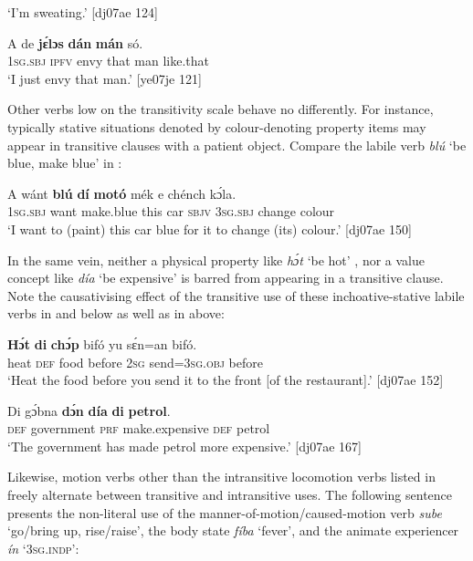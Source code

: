 \glt ‘I’m sweating.’ [dj07ae 124]
\z


\ea%
    \label{ex:key:1104}
    \gll A    de  \textbf{jɛ́lɔs}  \textbf{dán}    \textbf{mán}  só.\\
\textsc{1sg.sbj}  \textsc{ipfv}  envy  that    man    like.that\\

\glt ‘I just envy that man.’ [ye07je 121]
\z

Other verbs low on the transitivity scale behave no differently. For instance, typically stative situations denoted by colour-denoting property items may appear in transitive clauses with a patient object. Compare the labile verb \textit{blú} ‘be blue, make blue’ in :


\ea%
    \label{ex:key:1105}
    \gll A    wánt  \textbf{blú}      \textbf{dí}  \textbf{motó}  mék    e    chénch  kɔ́la.\\
\textsc{1sg.sbj}  want  make.blue  this  car    \textsc{sbjv}    \textsc{3sg.sbj}  change  colour\\

\glt ‘I want to (paint) this car blue for it to change (its) colour.’ [dj07ae 150]
\z

In the same vein, neither a physical property like \textit{hɔ́t} ‘be hot’ , nor a value concept like \textit{día} ‘be expensive’  is barred from appearing in a transitive clause. Note the causativising effect of the transitive use of these inchoative-stative labile verbs in  and  below as well as in  above: 

\ea%
    \label{ex:key:1106}
    \gll \textbf{Hɔ́t}    \textbf{di}  \textbf{chɔ́p}  bifó    yu  sɛ́n=an    bifó.\\
heat    \textsc{def}  food    before  \textsc{2sg}  send=\textsc{3sg.obj}  before\\

\glt ‘Heat the food before you send it to the front [of the restaurant].’ [dj07ae 152]
\z


\ea%
    \label{ex:key:1107}
    \gll Di  gɔ́bna    \textbf{dɔ́n}  \textbf{día}        \textbf{di}  \textbf{petrol}.\\
\textsc{def}  government  \textsc{prf}  make.expensive  \textsc{def}  petrol\\

\glt ‘The government has made petrol more expensive.’ [dj07ae 167]
\z

Likewise, motion verbs other than the intransitive locomotion verbs listed in  freely alternate between transitive and intransitive uses. The following sentence presents the non-literal use of the manner-of-motion/caused-motion verb \textit{sube} ‘go/bring up, rise{\slash}raise’, the body state \textit{fíba} ‘fever’, and the animate experiencer \textit{ín} ‘\textsc{3sg.indp}’: 


